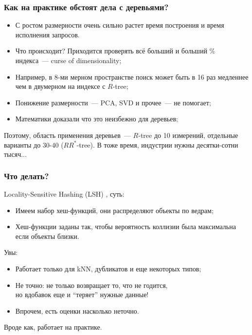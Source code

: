\documentclass{beamer}
\begin{document}
\begin{frame}
\frametitle{Как на практике обстоят дела с деревьями?}

\begin{itemize}
  \setlength\itemsep{1em}
  \item С ростом размерности очень сильно растет время построения и время исполнения запросов.
  \item Что происходит? Приходится проверять всё больший и больший \% индекса~--- \alert{curse of dimensionality};
  \item Например, в 8-ми мерном пространстве поиск может быть в 16 раз медленнее чем в двумерном на индексе с $R$-tree;
  \item Понижение размерности~--- PCA, SVD и прочее~--- не помогает;
  \item \alert{Математики доказали что это неизбежно для деревьев};
\end{itemize}

Поэтому, область применения деревьев~--- $R$-tree до 10 измерений, отдельные варианты до 30-40 ($RR^*$-tree). В тоже время, индустрии нужны десятки-сотни тысяч...

\end{frame}


\begin{frame}
\frametitle{Что делать?}

Locality-Sensitive Hashing (LSH) \cite{Gionis1999}, суть:

\begin{itemize}
  \setlength\itemsep{1em}
  \item Имеем набор хеш-функций, они распределяют объекты по ведрам;
  \item Хеш-функции заданы так, чтобы вероятность коллизии была максимальна если объекты близки. 
\end{itemize}

Увы:

\begin{itemize}
  \setlength\itemsep{1em}
  \item Работает только для kNN, дубликатов и еще некоторых типов;
  \item Не точно: не только возвращает то, что не годится, \\ но вдобавок еще и ``теряет'' нужные данные!
  \item Впрочем, есть оценки насколько неточно. 
\end{itemize}

Вроде как, работает на практике.

\end{frame}
\end{document}

